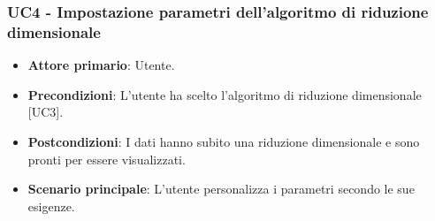 \subsubsection{UC4 - Impostazione parametri dell'algoritmo di riduzione dimensionale}
\begin{itemize}
	\item \textbf{Attore primario}: Utente.
	\item \textbf{Precondizioni}: L'utente ha scelto l'algoritmo di riduzione dimensionale [UC3].
	\item \textbf{Postcondizioni}: I dati hanno subito una riduzione dimensionale e sono pronti per essere visualizzati.
	\item \textbf{Scenario principale}: L'utente personalizza i parametri secondo le sue esigenze.
\end{itemize}